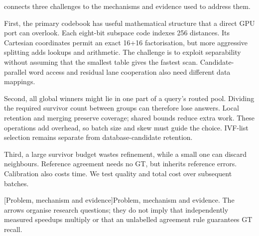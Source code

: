  connects three challenges to the mechanisms and
evidence used to address them.

First, the primary codebook has useful mathematical structure that a direct
GPU port can overlook. Each eight-bit subspace code indexes 256 distances.
Its Cartesian coordinates permit an exact 16+16 factorisation, but more
aggressive splitting adds lookups and arithmetic. The challenge is to exploit
separability without assuming that the smallest table gives the fastest
scan. Candidate-parallel word access and residual lane cooperation also need
different data mappings.

Second, all global winners might lie in one part of a query's routed pool. Dividing the required survivor count between groups can therefore lose answers. Local retention and merging preserve coverage; shared bounds reduce extra work. These operations add overhead, so batch size and skew must guide the choice. IVF-list selection remains separate from database-candidate retention.

Third, a large survivor budget wastes refinement, while a small one can discard neighbours. Reference agreement needs no GT, but inherits reference errors. Calibration also costs time. We test quality and total cost over subsequent batches.

\par\medskip\noindent\begin{minipage}{\linewidth}
\centering\captionsetup{hypcap=false}
\resizebox{\linewidth}{!}{}
[Problem, mechanism and evidence]{Problem, mechanism and evidence. The arrows organise
research questions; they do not imply that independently measured speedups
multiply or that an unlabelled agreement rule guarantees GT recall.}
\label{fig:1-challenges}
\end{minipage}\par\medskip
